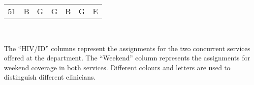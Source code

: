 \begin{table}[htbp]
\begin{adjustbox}{scale=0.8}
\begin{tabular}{c||ccc||ccc}
    51    & \cellcolor[rgb]{ .608,  .761,  .902}B & \cellcolor[rgb]{ .518,  .592,  .69}G & \cellcolor[rgb]{ .518,  .592,  .69}G & \cellcolor[rgb]{ .608,  .761,  .902}B & \cellcolor[rgb]{ .518,  .592,  .69}G & \cellcolor[rgb]{ .957,  .69,  .518}E \\
    \end{tabular}%
	\end{adjustbox}\\[1em]
	\footnotesize\raggedright
	The ``HIV/ID'' columns represent the assignments for the two concurrent services offered at the department. The ``Weekend'' column represents the assignments for weekend coverage in both services. Different colours and letters are used to distinguish different clinicians.
\end{table}%

